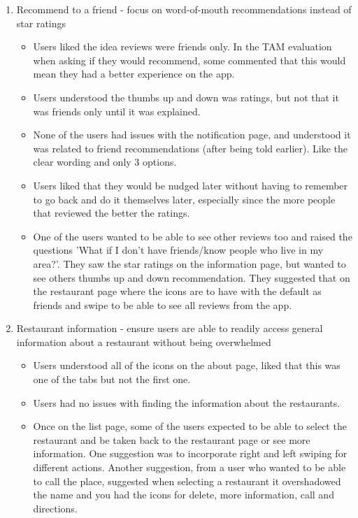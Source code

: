 \documentclass[a4 paper, 12pt]{article}
\begin{document}
\begin{enumerate}
    \item Recommend to a friend - focus on word-of-mouth recommendations instead of star ratings
        \begin{itemize}
            \item Users liked the idea reviews were friends only. In the TAM evaluation when asking if they would recommend, some commented that this would mean they had a better experience on the app. 
            \item Users understood the thumbs up and down was ratings, but not that it was friends only until it was explained.
            \item None of the users had issues with the notification page, and understood it was related to friend recommendations (after being told earlier). Like the clear wording and only 3 options. 
            \item Users liked that they would be nudged later without having to remember to go back and do it themselves later, especially since the more people that reviewed the better the ratings.
            \item One of the users wanted to be able to see other reviews too and raised the questions 'What if I don't have friends/know people who live in my area?'. They saw the star ratings on the information page, but wanted to see others thumbs up and down recommendation. They suggested that on the restaurant page where the icons are to have with the default as friends and swipe to be able to see all reviews from the app.
        \end{itemize}

    \item Restaurant information - ensure users are able to readily access general information about a restaurant without being overwhelmed 
        \begin{itemize} 
            \item Users understood all of the icons on the about page, liked that this was one of the tabs but not the first one.  
            \item Users had no issues with finding the information about the restaurants.
            \item Once on the list page, some of the users expected to be able to select the restaurant and be taken back to the restaurant page or see more information. One suggestion was to incorporate right and left swiping for different actions. Another suggestion, from a user who wanted to be able to call the place, suggested when selecting a restaurant it overshadowed the name and you had the icons for delete, more information, call and directions.  
        \end{itemize}
\end{enumerate}
\end{document}
